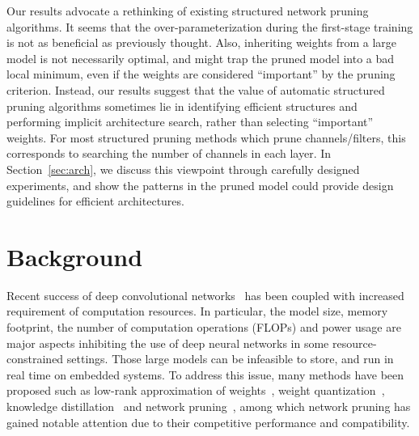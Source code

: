 Our results advocate a rethinking of existing structured network pruning algorithms. It seems that the over-parameterization during the first-stage training is not as beneficial as previously thought. Also, inheriting weights from a large model is not necessarily optimal, and might trap the pruned model into a bad local minimum, even if the weights are considered ``important'' by the pruning criterion. Instead, our results suggest that the value of automatic structured pruning algorithms sometimes lie in identifying efficient structures and performing implicit architecture search, rather than selecting ``important'' weights. For most structured pruning methods which prune channels/filters, this corresponds to searching the number of channels in each layer. In Section~\ref{sec:arch}, we discuss this viewpoint through carefully designed experiments, and show the patterns in the pruned model could provide design guidelines for efficient architectures.



\section{Background}
Recent success of deep convolutional networks~\cite{lecun1998gradient, imagenet,rcnn,fcn,resnet,He2017} has been coupled with increased requirement of computation resources. In particular, the model size, memory footprint, the number of computation operations (FLOPs) and power usage are major aspects inhibiting the use of deep neural networks in some resource-constrained settings. Those large models can be infeasible to store, and run in real time on embedded systems. To address this issue, many methods have been proposed such as low-rank approximation of weights~\cite{lowrank1, lowrank2}, weight quantization~\cite{binarynet, xnornet}, knowledge distillation~\cite{hinton2015distilling, fitnet} and network pruning~\cite{han2015learning,li2016pruning}, among which network pruning has gained notable attention due to their competitive performance and compatibility.

